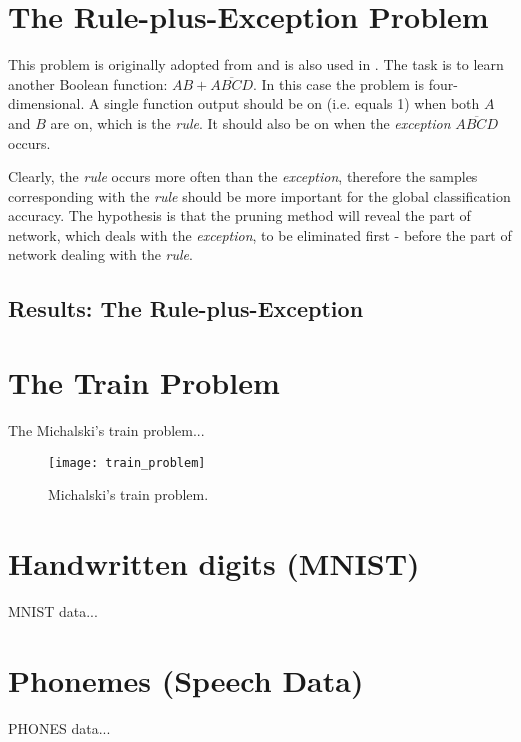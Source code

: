 \section{The Rule-plus-Exception Problem} \label{sec:dataset_rpe}
This problem is originally adopted from \citep{mozer_smolensky} and is also used in \citep{karnin}. The task is to learn another Boolean function: $ AB+\overline{ABCD} $. In this case the problem is four-dimensional. A single function output should be on (i.e. equals 1) when both $ A $ and $ B $ are on, which is the \textit{rule}. It should also be on when the \textit{exception} $ \overline{ABCD} $ occurs.

Clearly, the \textit{rule} occurs more often than the \textit{exception}, therefore the samples corresponding with the \textit{rule} should be more important for the global classification accuracy. The hypothesis is that the pruning method will reveal the part of network, which deals with the \textit{exception}, to be eliminated first - before the part of network dealing with the \textit{rule}.

\subsection*{Results: The Rule-plus-Exception}

\section{The Train Problem} \label{sec:dataset_train}
The Michalski's train problem...

\begin{figure}[H]
\centering
\texttt{[image: train\_problem]}
\caption{Michalski's train problem.}
\label{fig:examples:dataset_train}
\end{figure}

\section{Handwritten digits (MNIST)} \label{sec:dataset_mnist}
MNIST data... \citep{online:mnist}

\section{Phonemes (Speech Data)} \label{sec:dataset_phonemes}
PHONES data...
